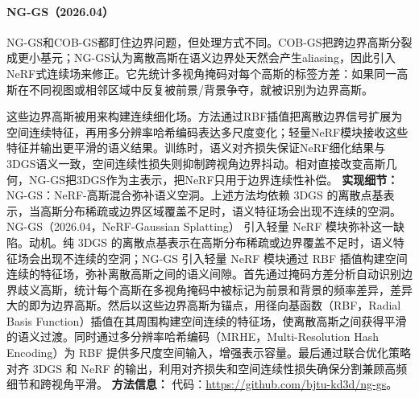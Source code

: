 \paragraph{NG-GS（2026.04）\cite{2604_14706}}
NG-GS和COB-GS都盯住边界问题，但处理方式不同。COB-GS把跨边界高斯分裂成更小基元；NG-GS认为离散高斯在语义边界处天然会产生aliasing，因此引入NeRF式连续场来修正。它先统计多视角掩码对每个高斯的标签方差：如果同一高斯在不同视图或相邻区域中反复被前景/背景争夺，就被识别为边界高斯。

这些边界高斯被用来构建连续细化场。方法通过RBF插值把离散边界信号扩展为空间连续特征，再用多分辨率哈希编码表达多尺度变化；轻量NeRF模块接收这些特征并输出更平滑的语义结果。训练时，语义对齐损失保证NeRF细化结果与3DGS语义一致，空间连续性损失则抑制跨视角边界抖动。相对直接改变高斯几何，NG-GS把3DGS作为主表示，把NeRF只用于边界连续性补偿。
\textbf{实现细节：} NG-GS：NeRF-高斯混合弥补语义空洞。上述方法均依赖 3DGS 的离散点基表示，当高斯分布稀疏或边界区域覆盖不足时，语义特征场会出现不连续的空洞。NG-GS（2026.04，NeRF-Gaussian Splatting） 引入轻量 NeRF 模块弥补这一缺陷。动机。纯 3DGS 的离散点基表示在高斯分布稀疏或边界覆盖不足时，语义特征场会出现不连续的空洞；NG-GS 引入轻量 NeRF 模块通过 RBF 插值构建空间连续的特征场，弥补离散高斯之间的语义间隙。首先通过掩码方差分析自动识别边界歧义高斯，统计每个高斯在多视角掩码中被标记为前景和背景的频率差异，差异大的即为边界高斯。然后以这些边界高斯为锚点，用径向基函数（RBF，Radial Basis Function）插值在其周围构建空间连续的特征场，使离散高斯之间获得平滑的语义过渡。同时通过多分辨率哈希编码（MRHE，Multi-Resolution Hash Encoding）为 RBF 提供多尺度空间输入，增强表示容量。最后通过联合优化策略对齐 3DGS 和 NeRF 的输出，利用对齐损失和空间连续性损失确保分割兼顾高频细节和跨视角平滑。
\textbf{方法信息：} 代码：\url{https://github.com/bjtu-kd3d/ng-gs}。



